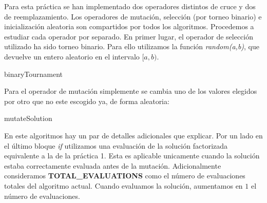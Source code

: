 \documentclass[11pt,a4paper]{article}
\begin{document}
	Para esta práctica se han implementado dos operadores distintos de cruce y dos de reemplazamiento. Los operadores de mutación, selección (por torneo binario) e inicialización aleatoria son compartidos por todos los algoritmos. Procedemos a estudiar cada operador por separado. En primer lugar, el operador de selección utilizado ha sido torneo binario. Para ello utilizamos la función \emph{random(a,b)}, que devuelve un entero aleatorio en el intervalo $[a,b)$.
	
	\begin{algorithm}[H]
		\caption{binaryTournament}
	\end{algorithm}

	Para el operador de mutación simplemente se cambia uno de los valores elegidos por otro que no este escogido ya, de forma aleatoria: 
	
	\begin{algorithm}[H]
		\caption{mutateSolution}
	\end{algorithm}
	
	En este algoritmos hay un par de detalles adicionales que explicar. Por un lado en el último bloque \emph{if} utilizamos una evaluación de la solución factorizada equivalente a la de la práctica 1. Esta es aplicable unicamente cuando la solución estaba correctamente evaluada antes de la mutación. Adicionalmente consideramos \textbf{TOTAL\_EVALUATIONS} como el número de evaluaciones totales del algoritmo actual. Cuando evaluamos la solución, aumentamos en $1$ el número de evaluaciones. \\
	
\end{document}

